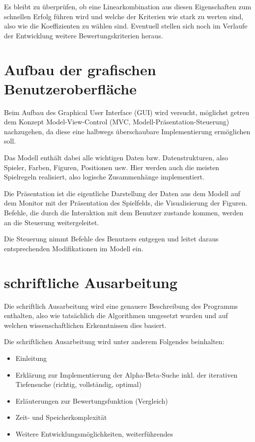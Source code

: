 \documentclass[
	12pt,
	halfparskip,
	a4paper,
	abstract,
	bibliography=totoc,
	liststotoc
]{scrreprt}
\begin{document}
Es bleibt zu überprüfen, ob eine Linearkombination aus diesen Eigenschaften zum schnellen Erfolg führen wird und welche der Kriterien wie stark zu werten sind, also wie die Koeffizienten zu wählen sind. Eventuell stellen sich noch im Verlaufe der Entwicklung weitere Bewertungskriterien heraus.

\section{Aufbau der grafischen Benutzeroberfläche}

Beim Aufbau des Graphical User Interface (GUI) wird versucht, möglichst getreu dem Konzept Model-View-Control (MVC, Modell-Präsentation-Steuerung) nachzugehen, da diese eine halbwegs überschaubare Implementierung ermöglichen soll.

Das Modell enthält dabei alle wichtigen Daten bzw. Datenstrukturen, also Spieler, Farben, Figuren, Positionen usw. Hier werden auch die meisten Spielregeln realisiert, also logische Zusammenhänge implementiert.

Die Präsentation ist die eigentliche Darstellung der Daten aus dem Modell auf dem Monitor mit der Präsentation des Spielfelds, die Visualisierung der Figuren. Befehle, die durch die Interaktion mit dem Benutzer zustande kommen, werden an die Steuerung weitergeleitet.

Die Steuerung nimmt Befehle des Benutzers entgegen und leitet daraus entsprechenden Modifikationen im Modell ein.

\citep{mvc, mvc2}

\section{schriftliche Ausarbeitung}

Die schriftlich Ausarbeitung wird eine genauere Beschreibung des Programms enthalten, also wie tatsächlich die Algorithmen umgesetzt wurden und auf welchen wissenschaftlichen Erkenntnissen dies basiert.

\begin{samepage}
Die schriftlichen Ausarbeitung wird unter anderem Folgendes beinhalten:
\begin{itemize}
\item Einleitung
\item Erklärung zur Implementierung der Alpha-Beta-Suche inkl. der iterativen Tiefensuche (richtig, vollständig, optimal)
\item Erläuterungen zur Bewertungsfunktion (Vergleich)
\item Zeit- und Speicherkomplexität
\item Weitere Entwicklungsmöglichkeiten, weiterführendes
\end{itemize}
\end{samepage}
\end{document}
